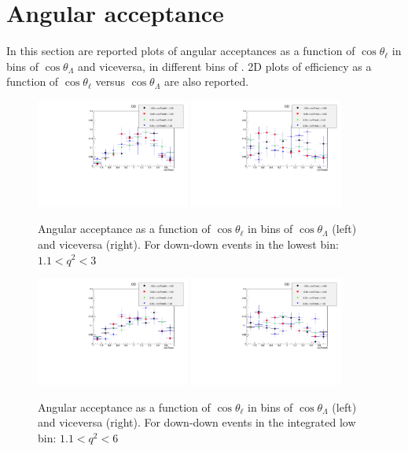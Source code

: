\section{Angular acceptance}
\label{app:Efficiencies}

In this section are reported plots of angular acceptances as a function of $\cos\theta_\ell$ in bins of $\cos\theta_\Lambda$
and viceversa, in different bins of \qsq. 2D plots of efficiency as a function of $\cos\theta_\ell$ versus $\cos\theta_\Lambda$
are also reported.


\begin{figure}[h!]
\includegraphics[width=0.45\textwidth]{Lmumu/figs/effs/DDeff_lowestq2.pdf}
\includegraphics[width=0.45\textwidth]{Lmumu/figs/effs/DDBeff_lowestq2.pdf} 
\caption{Angular acceptance as a function of $\cos\theta_\ell$ in bins of $\cos\theta_\Lambda$ (left) and viceversa (right). For down-down events in the lowest \qsq bin: $1.1 < q^2 < 3$}
\end{figure}


\begin{figure}[h!]
\includegraphics[width=0.45\textwidth]{Lmumu/figs/effs/DDeff_lowq2.pdf}
\includegraphics[width=0.45\textwidth]{Lmumu/figs/effs/DDBeff_lowq2.pdf} 
\caption{Angular acceptance as a function of $\cos\theta_\ell$ in bins of $\cos\theta_\Lambda$ (left) and viceversa (right). For down-down events in the integrated low \qsq bin: $1.1 < q^2 < 6$}
\end{figure}

